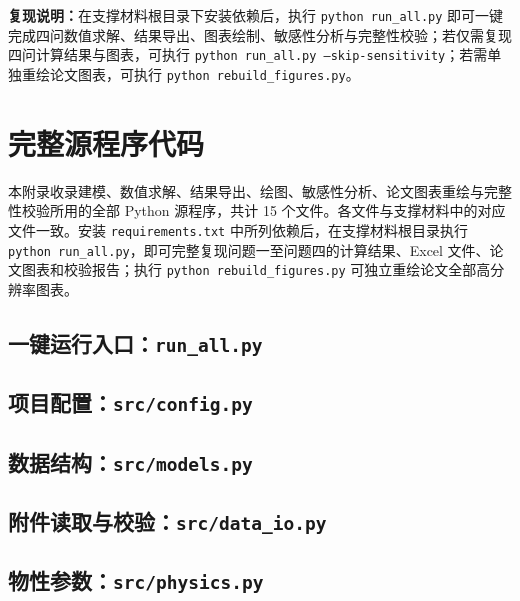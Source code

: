\documentclass[12pt,a4paper,fontset=none]{ctexart}
\begin{document}
\vspace{-0.3em}
\noindent\textbf{复现说明：}在支撑材料根目录下安装依赖后，执行 \texttt{python run\_all.py} 即可一键完成四问数值求解、结果导出、图表绘制、敏感性分析与完整性校验；若仅需复现四问计算结果与图表，可执行 \texttt{python run\_all.py --skip-sensitivity}；若需单独重绘论文图表，可执行 \texttt{python rebuild\_figures.py}。

\clearpage
\appendix
\section{完整源程序代码}

本附录收录建模、数值求解、结果导出、绘图、敏感性分析、论文图表重绘与完整性校验所用的全部 Python 源程序，共计 15 个文件。各文件与支撑材料中的对应文件一致。安装 \texttt{requirements.txt} 中所列依赖后，在支撑材料根目录执行 \texttt{python run\_all.py}，即可完整复现问题一至问题四的计算结果、Excel 文件、论文图表和校验报告；执行 \texttt{python rebuild\_figures.py} 可独立重绘论文全部高分辨率图表。

\begingroup
{}

\subsection{一键运行入口：\texttt{run\_all.py}}


\subsection{项目配置：\texttt{src/config.py}}


\subsection{数据结构：\texttt{src/models.py}}


\subsection{附件读取与校验：\texttt{src/data\_io.py}}


\subsection{物性参数：\texttt{src/physics.py}}

\end{document}
